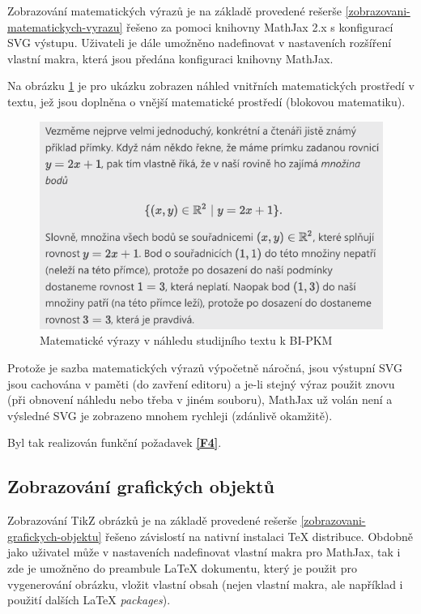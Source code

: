 Zobrazování matematických výrazů je na základě provedené rešerše \ref{zobrazovani-matematickych-vyrazu} řešeno za pomoci
knihovny MathJax 2.x s konfigurací SVG výstupu. Uživateli je dále umožněno nadefinovat v nastaveních rozšíření vlastní
makra, která jsou předána konfiguraci knihovny MathJax.

Na obrázku \ref{zobrazeni-nahledu-pkm-matematika} je pro ukázku zobrazen náhled vnitřních matematických prostředí v textu,
jež jsou doplněna o vnější matematické prostředí (blokovou matematiku).

\begin{figure}\centering
    \includegraphics[width=1.0\textwidth]{content/realizace/zobrazení-náhledu-pkm-matematika}
 	\caption[Matematické výrazy v náhledu dokumentu]{Matematické výrazy v náhledu studijního textu k BI-PKM~\cite{pkm}}
    \label{zobrazeni-nahledu-pkm-matematika}
\end{figure}

Protože je sazba matematických výrazů výpočetně náročná, jsou výstupní SVG jsou cachována v paměti (do zavření editoru)
a je-li stejný výraz použit znovu (při obnovení náhledu nebo třeba v jiném souboru), MathJax už volán není a výsledné
SVG je zobrazeno mnohem rychleji (zdánlivě okamžitě).

Byl tak realizován funkční požadavek \textbf{\ref{F4}}.

\subsection{Zobrazování grafických objektů}

Zobrazování TikZ obrázků je na základě provedené rešerše \ref{zobrazovani-grafickych-objektu} řešeno závislostí na
nativní instalaci \TeX{} distribuce. Obdobně jako uživatel může v nastaveních nadefinovat vlastní makra pro MathJax, tak
i zde je umožněno do preambule \LaTeX{} dokumentu, který je použit pro vygenerování obrázku, vložit vlastní obsah (nejen
vlastní makra, ale například i použití dalších \LaTeX{} \textit{packages}).

